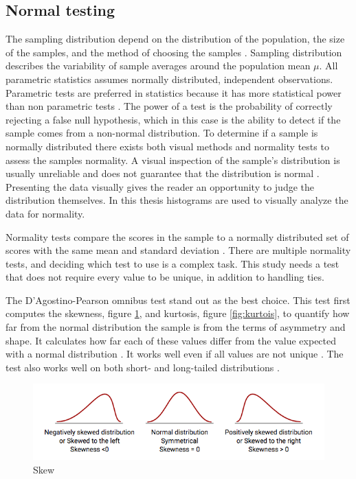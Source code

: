 \subsection{Normal testing}\label{sec:normaltesting}
The sampling distribution depend on the distribution of the population, the size of the samples, and the method of choosing the samples \citep{Walpole2012}. Sampling distribution describes the variability of sample averages around the population mean $\mu$. All parametric statistics assumes normally distributed, independent observations. Parametric tests are preferred in statistics because it has more statistical power than non parametric tests \citep{Frost2015}. The power of a test is the probability of correctly rejecting a false null hypothesis, which in this case is the ability to detect if the sample comes from a non-normal distribution. To determine if a sample is normally distributed there exists both visual methods and normality tests to assess the samples normality. A visual inspection of the sample's distribution is usually unreliable and does not guarantee that the distribution is normal \citep{Pearson2006}. Presenting the data visually gives the reader an opportunity to judge the distribution themselves. In this thesis histograms are used to visually analyze the data for normality. 

Normality tests compare the scores in the sample to a normally distributed set of scores with the same mean and standard deviation \citep{Ghasemi2012}. There are multiple normality tests, and deciding which test to use is a complex task. This study needs a test that does not require every value to be unique, in addition to handling ties.

The D'Agostino-Pearson omnibus test stand out as the best choice. This test first computes the skewness, figure \ref{fig:skew}, and kurtosis, figure \ref{fig:kurtois}, to quantify how far from the normal distribution the sample is from the terms of asymmetry and shape. It calculates how far each of these values differ from the value expected with a normal distribution \citep{Pearson2006}. It works well even if all values are not unique \citep{Motulsky2013}. The test also works well on both short- and long-tailed distributions \citep{Yap2011}. \newline  %

\begin{figure}[h!]
	\centering
	\includegraphics[width=0.7\linewidth]{"fig/skew"}
	\caption{Skew \citep{MedCalcSoftwarebvba2017}}
	\label{fig:skew}
\end{figure}

